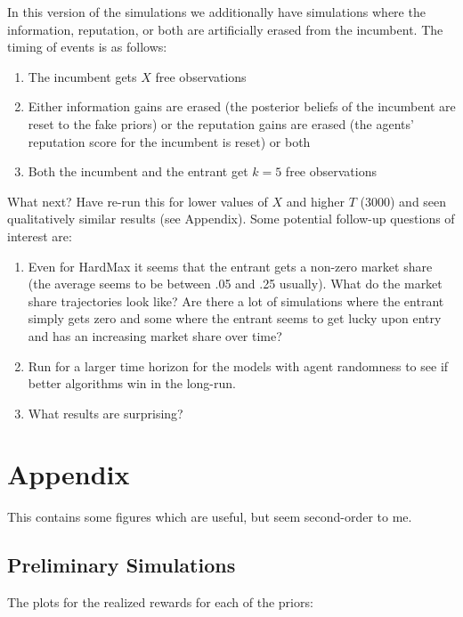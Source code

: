 \documentclass[11pt,letterpaper]{article}
\begin{document}
In this version of the simulations we additionally have simulations where the information, reputation, or both are artificially erased from the incumbent. The timing of events is as follows:
\begin{enumerate}
\item The incumbent gets $X$ free observations
\item Either information gains are erased (the posterior beliefs of the incumbent are reset to the fake priors) or the reputation gains are erased (the agents' reputation score for the incumbent is reset) or both
\item Both the incumbent and the entrant get $k=5$ free observations
\end{enumerate}



What next? Have re-run this for lower values of $X$ and higher $T$ (3000) and seen qualitatively similar results (see Appendix). Some potential follow-up questions of interest are:
\begin{enumerate}
\item Even for HardMax it seems that the entrant gets a non-zero market share (the average seems to be between .05 and .25 usually). What do the market share trajectories look like? Are there a lot of simulations where the entrant simply gets zero and some where the entrant seems to get lucky upon entry and has an increasing market share over time?
\item Run for a larger time horizon for the models with agent randomness to see if better algorithms win in the long-run.
\item What results are surprising?
\end{enumerate}

\section*{Appendix}

This contains some figures which are useful, but seem second-order to me.

\subsection*{Preliminary Simulations}

The plots for the realized rewards for each of the priors:
\end{document}
